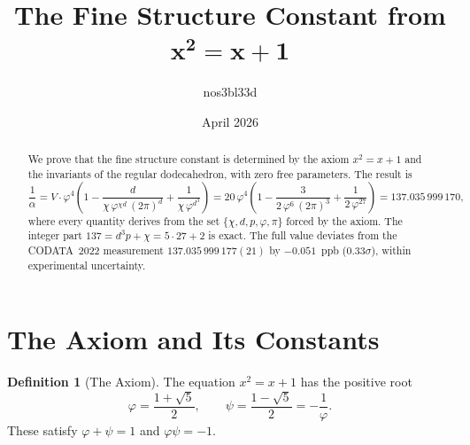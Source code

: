 \documentclass[11pt,a4paper]{article}
\theoremstyle{plain}
\theoremstyle{definition}
\newtheorem{definition}[theorem]{Definition}
\newcommand{\vp}{\varphi}
\begin{document}
\title{%
  \textbf{The Fine Structure Constant from}\\[4pt]
  $\boldsymbol{x^2 = x + 1}$%
}
\author{nos3bl33d}
\date{April 2026}

\maketitle

\begin{abstract}
We prove that the fine structure constant is determined by the axiom
$x^2 = x+1$ and the invariants of the regular dodecahedron, with zero
free parameters.  The result is
\[
  \frac{1}{\alpha}
  = V \cdot \vp^4 \!\left(
      1
      - \frac{d}{\chi\,\vp^{\chi d}\,(2\pi)^d}
      + \frac{1}{\chi\,\vp^{d^3}}
    \right)
  = 20\,\vp^4\!\left(
      1
      - \frac{3}{2\,\vp^6\,(2\pi)^3}
      + \frac{1}{2\,\vp^{27}}
    \right)
  = 137.035\,999\,170,
\]
where every quantity derives from the set $\{\chi,d,p,\vp,\pi\}$
forced by the axiom.  The integer part $137 = d^3 p + \chi = 5 \cdot 27 + 2$
is exact.  The full value deviates from the CODATA~2022 measurement
$137.035\,999\,177(21)$ by $-0.051$~ppb ($0.33\sigma$), within
experimental uncertainty.
\end{abstract}

\section{The Axiom and Its Constants}\label{sec:axiom}

\begin{definition}[The Axiom]\label{def:axiom}
The equation $x^2 = x + 1$ has the positive root
\[
  \vp = \frac{1+\sqrt{5}}{2}, \qquad
  \psi = \frac{1-\sqrt{5}}{2} = -\frac{1}{\vp}.
\]
These satisfy $\vp + \psi = 1$ and $\vp\psi = -1$.
\end{definition}
\end{document}
